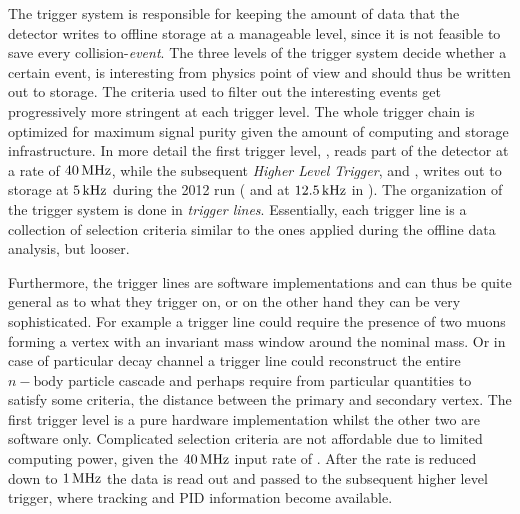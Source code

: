 
The trigger system is responsible for keeping the amount of data that the detector writes to offline storage
at a manageable level, since it is not feasible to save every collision-{\it event}. The three levels of
the \lhcb trigger system decide whether a certain event, is interesting from physics point
of view and should thus be written out to storage. The criteria used to filter out the interesting events
get progressively more stringent at each trigger level. The whole trigger chain is optimized for maximum
signal purity given the amount of computing and storage infrastructure. In more detail the first trigger
level, \lzero, reads part of the detector at a rate of $40{\rm \,MHz}$, while the subsequent {\it Higher Level Trigger},
\hltone and \hlttwo, writes out to storage at $5{\rm \,kHz}$ during the 2012 run ( and at $12.5{\rm \,kHz}$ in \runtwo).
The organization of the trigger system is done in {\it trigger lines}. Essentially, each trigger line is
a collection of selection criteria similar to the ones applied during the offline data analysis, but looser.

Furthermore, the \hlt trigger lines are software
implementations and can thus be quite general as to what they trigger on, or on the other hand they can
be very sophisticated. For example a trigger line could require the presence of two muons forming a vertex
with an invariant mass window around the nominal \jpsi mass. Or in case of particular decay channel a
trigger line could reconstruct the entire $n-\text{body}$ particle cascade and perhaps require from
particular quantities to satisfy some criteria, \ie the distance between the primary and secondary vertex.
The first trigger level is a pure hardware implementation whilst the other two are software only.
Complicated selection criteria are not affordable due to limited computing power, given the
$40{\rm \,MHz}$ input rate of \lzero. After the rate is reduced down to $1{\rm \,MHz}$ the data is read out and
passed to the subsequent higher level trigger, where tracking and PID information become available.

